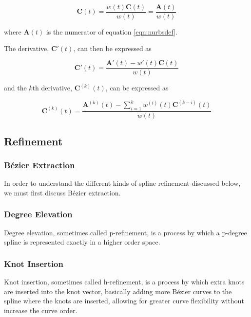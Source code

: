 \begin{equation} \textbf{C}(t) = \frac{ w(t) \textbf{C}(t) }{ w(t) } = \frac{ \textbf{A}(t) }{ w(t) }   \end{equation}  

where $\textbf{A}(t) $ is the numerator of equation \cref{eqn:nurbsdef}.

The derivative, $\textbf{C}'(t)$, can then be expressed as

\begin{equation} \textbf{C}'(t) = \frac{ \textbf{A}'(t) - w'(t) \textbf{C}(t) }{ w(t) }   \end{equation}

and the $k$th derivative, $\textbf{C}^{ (k) }  (t)$, can be expressed as

\begin{equation} \textbf{C}^{(k)}(t) = \frac{ \textbf{A}^{(k)}(t) - \displaystyle \sum^k_{i=1} w^{(i)} (t) \textbf{C}^{(k-i)} (t) }{ w(t) }   \end{equation}

\subsection{Refinement}

\subsubsection{Bézier Extraction}
In order to understand the different kinds of spline refinement discussed below, we must first discuss Bézier extraction.


\subsubsection{Degree Elevation}
Degree elevation, sometimes called p-refinement, is a process by which a p-degree spline is represented exactly in a higher order space.


\subsubsection{Knot Insertion}
Knot insertion, sometimes called h-refinement, is a process by which extra knots are inserted into the knot vector, basically adding more Bézier curves to the spline where the knots are inserted, allowing for greater curve flexibility without increase the curve order.


